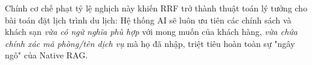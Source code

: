 Chính cơ chế phạt tỷ lệ nghịch này khiến RRF trở thành thuật toán lý tưởng cho bài toán đặt lịch trình du lịch: Hệ thống AI sẽ luôn ưu tiên các chính sách và khách sạn \textit{vừa có ngữ nghĩa phù hợp} với mong muốn của khách hàng, \textit{vừa chứa chính xác mã phòng/tên dịch vụ} mà họ đã nhập, triệt tiêu hoàn toàn sự "ngây ngô" của Native RAG.
